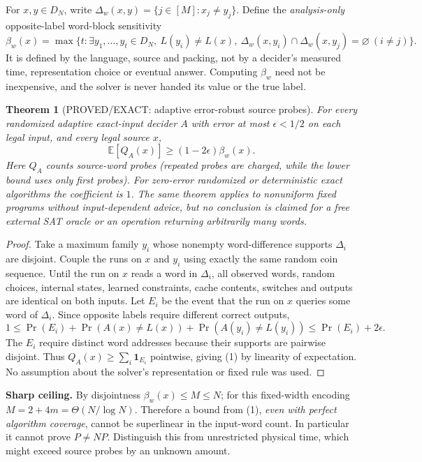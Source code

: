 \documentclass[11pt]{article}
\newtheorem{theorem}{Theorem}
\begin{document}
For $x,y\in D_N$, write
$\Delta_w(x,y)=\{j\in[M]:x_j\ne y_j\}$.
Define the \emph{analysis-only} opposite-label word-block sensitivity
\[
\beta_w(x)=\max\bigl\{t:
\exists y_1,\ldots,y_t\in D_N,\
L(y_i)\ne L(x),\
\Delta_w(x,y_i)\cap\Delta_w(x,y_j)=\varnothing\ (i\ne j)\bigr\}.
\]
It is defined by the language, source and packing, not by a decider's measured time, representation choice or eventual answer. Computing $\beta_w$ need not be inexpensive, and the solver is never handed its value or the true label.
\begin{theorem}[PROVED/EXACT: adaptive error-robust source probes]
For every randomized adaptive exact-input decider $A$ with error at most $\epsilon<1/2$ on each legal input, and every legal source $x$,
\[
\boxed{\mathbb E[Q_A(x)]\ge(1-2\epsilon)\beta_w(x).}
\tag{1}
\]
Here $Q_A$ counts source-word probes (repeated probes are charged, while the lower bound uses only first probes). For zero-error randomized or deterministic exact algorithms the coefficient is $1$. The same theorem applies to nonuniform fixed programs without input-dependent advice, but no conclusion is claimed for a free external SAT oracle or an operation returning arbitrarily many words.
\end{theorem}
\begin{proof}
Take a maximum family $y_i$ whose nonempty word-difference supports $\Delta_i$ are disjoint. Couple the runs on $x$ and $y_i$ using exactly the same random coin sequence. Until the run on $x$ reads a word in $\Delta_i$, all observed words, random choices, internal states, learned constraints, cache contents, switches and outputs are identical on both inputs. Let $E_i$ be the event that the run on $x$ queries some word of $\Delta_i$. Since opposite labels require different correct outputs,
\[
1\le\Pr(E_i)+\Pr(A(x)\ne L(x))+
\Pr(A(y_i)\ne L(y_i))
\le\Pr(E_i)+2\epsilon.
\]
The $E_i$ require distinct word addresses because their supports are pairwise disjoint. Thus $Q_A(x)\ge\sum_i\mathbf1_{E_i}$ pointwise, giving (1) by linearity of expectation. No assumption about the solver's representation or fixed rule was used.
\end{proof}
\noindent\textbf{Sharp ceiling.}
By disjointness $\beta_w(x)\le M\le N$; for this fixed-width encoding $M=2+4m=\Theta(N/\log N)$. Therefore a bound from (1), \emph{even with perfect algorithm coverage}, cannot be superlinear in the input-word count. In particular it cannot prove $P\ne NP$. Distinguish this from unrestricted physical time, which might exceed source probes by an unknown amount.
\end{document}

